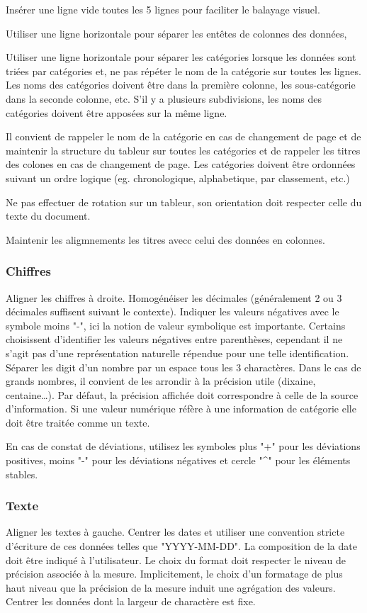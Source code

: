 \documentclass[a4paper,12pt]{article}
\begin{document}
\begin{multicols}{2}
Insérer une ligne vide toutes les 5 lignes pour faciliter le balayage visuel. \autocite{NFENISO9241-125ErgonomieLinteractionHommesysteme2017}

Utiliser une ligne horizontale pour séparer les entêtes de colonnes des données,

Utiliser une ligne horizontale pour séparer les catégories lorsque les données sont triées par catégories et, ne pas répéter le nom de la catégorie sur toutes les lignes. Les noms des catégories doivent être dans la première colonne, les sous-catégorie dans la seconde colonne, etc. S'il y a plusieurs subdivisions, les noms des catégories doivent être apposées sur la même ligne.

Il convient de rappeler le nom de la catégorie en cas de changement de page et de maintenir la structure du tableur sur toutes les catégories et de rappeler les titres des colones en cas de changement de page.
Les catégories doivent être ordonnées suivant un ordre logique (eg. chronologique, alphabetique, par classement, etc.)

Ne pas effectuer de rotation sur un tableur, son orientation doit respecter celle du texte du document.

Maintenir les aligmnements les titres avecc celui des données en colonnes.
\subsubsection*{Chiffres}
\label{sec:org3cb5704}
Aligner les chiffres à droite.
Homogénéiser les décimales (généralement 2 ou 3 décimales suffisent suivant le contexte).
Indiquer les valeurs négatives avec le symbole moins "-", ici la notion de valeur symbolique est importante. Certains choisissent d'identifier les valeurs négatives entre parenthèses, cependant il ne s'agit pas d'une représentation naturelle répendue pour une telle identification.
Séparer les digit d'un nombre par un espace tous les 3 charactères. Dans le cas de grands nombres, il convient de les arrondir à la précision utile (dixaine, centaine\ldots{}). Par défaut, la précision affichée doit correspondre à celle de la source d'information.
Si une valeur numérique réfère à une information de catégorie elle doit être traitée comme un texte.

En cas de constat de déviations, utilisez les symboles plus "+" pour les déviations positives, moins "-" pour les déviations négatives et cercle "\^{}" pour les éléments stables. \autocite{andreaskrauseBestPracticesData2024}
\subsubsection*{Texte}
\label{sec:org47cdbf7}
Aligner les textes à gauche.
Centrer les dates et utiliser une convention stricte d'écriture de ces données telles que "YYYY-MM-DD". \autocite{ISO8601-1DateHeureRepresentations2019} La composition de la date doit être indiqué à l'utilisateur. Le choix du format doit respecter le niveau de précision associée à la mesure. Implicitement, le choix d'un formatage de plus haut niveau que la précision de la mesure induit une agrégation des valeurs.
Centrer les données dont la largeur de charactère est fixe.

\end{multicols}
\end{document}
